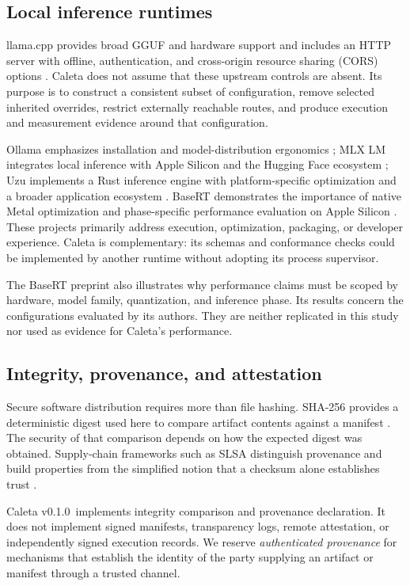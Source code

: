 \documentclass[11pt,a4paper]{article}
\newcommand{\softwareversion}{0.1.0}
\begin{document}
\subsection{Local inference runtimes}

llama.cpp provides broad GGUF and hardware support and includes an HTTP server with offline, authentication, and cross-origin resource sharing (CORS) options \cite{llamacpp}. Caleta does not assume that these upstream controls are absent. Its purpose is to construct a consistent subset of configuration, remove selected inherited overrides, restrict externally reachable routes, and produce execution and measurement evidence around that configuration.

Ollama emphasizes installation and model-distribution ergonomics \cite{ollama}; MLX LM integrates local inference with Apple Silicon and the Hugging Face ecosystem \cite{mlx}; Uzu implements a Rust inference engine with platform-specific optimization and a broader application ecosystem \cite{uzu}. BaseRT demonstrates the importance of native Metal optimization and phase-specific performance evaluation on Apple Silicon \cite{basert}. These projects primarily address execution, optimization, packaging, or developer experience. Caleta is complementary: its schemas and conformance checks could be implemented by another runtime without adopting its process supervisor.

The BaseRT preprint also illustrates why performance claims must be scoped by hardware, model family, quantization, and inference phase. Its results concern the configurations evaluated by its authors. They are neither replicated in this study nor used as evidence for Caleta's performance.

\subsection{Integrity, provenance, and attestation}

Secure software distribution requires more than file hashing. SHA-256 provides a deterministic digest used here to compare artifact contents against a manifest \cite{fips180-4}. The security of that comparison depends on how the expected digest was obtained. Supply-chain frameworks such as SLSA distinguish provenance and build properties from the simplified notion that a checksum alone establishes trust \cite{slsa}.

Caleta v\softwareversion\ implements integrity comparison and provenance declaration. It does not implement signed manifests, transparency logs, remote attestation, or independently signed execution records. We reserve \emph{authenticated provenance} for mechanisms that establish the identity of the party supplying an artifact or manifest through a trusted channel.
\end{document}
